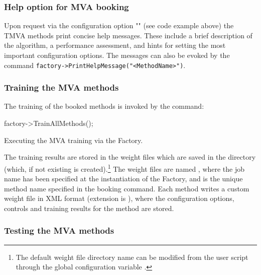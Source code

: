 \subsubsection{Help option for MVA booking
                           }
\label{sec:usingtmva:gettingHelp}

Upon request via the configuration option "" (see code example above) the TMVA 
methods print concise help messages. These include a brief description of the 
algorithm, a performance assessment, and hints for setting the most important 
configuration options. The messages can also be evoked by the command
{\tt factory->PrintHelpMessage("<MethodName>")}.

\subsubsection{Training the MVA methods}
\label{sec:usingtmva:training}

The training of the booked methods is invoked by the command:
\begin{codeexample}
\begin{tmvacode}
factory->TrainAllMethods(); 
\end{tmvacode}
\caption[.]{\codeexampleCaptionSize Executing the MVA training via the Factory.}
\end{codeexample}
The training results are stored in the weight files which are saved in the directory  (which, if
not existing is created).\footnote { The default weight file directory
  name can be modified from the user script through the global
  configuration variable
  .  } The weight
files are named , where
the job name has been specified at the instantiation of the Factory,
and  is the unique method name specified in the
booking command. Each method writes a custom weight file in XML format
(extension is ), where the
configuration options, controls and training results for the method
are stored.

\subsubsection{Testing the MVA methods}

